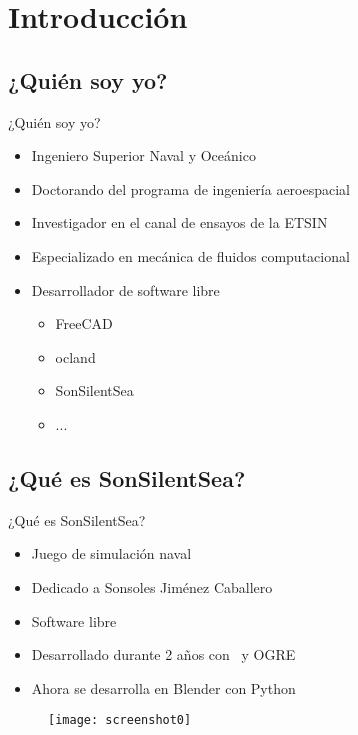 \section{Introducción} 

\subsection{¿Quién soy yo?}
\begin{frame}{¿Quién soy yo?}
	\begin{itemize}
		\item Ingeniero Superior Naval y Oceánico
		\item Doctorando del programa de ingeniería aeroespacial
		\item Investigador en el canal de ensayos de la ETSIN
		\item Especializado en mecánica de fluidos computacional
		\item Desarrollador de software libre
		\begin{itemize}
			\item FreeCAD
			\item ocland
			\item SonSilentSea
			\item ...
		\end{itemize}	
	\end{itemize}
\end{frame}

\subsection{¿Qué es SonSilentSea?}
\begin{frame}{¿Qué es SonSilentSea?}
	\begin{itemize}
		\item Juego de simulación naval
		\item Dedicado a Sonsoles Jiménez Caballero
		\item Software libre
		\item Desarrollado durante 2 años con \CC $\,$ y OGRE
		\item Ahora se desarrolla en Blender con Python
	\end{itemize}
	\begin{figure}
		\texttt{[image: screenshot0]} 
	\end{figure}
\end{frame}

